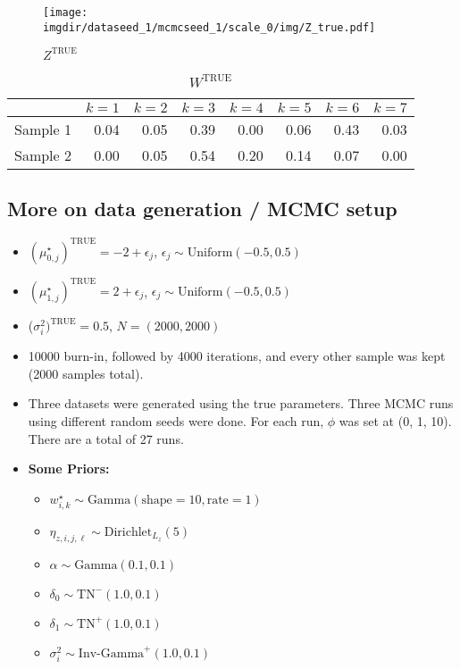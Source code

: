 \documentclass[10pt]{article} %
\newcommand{\Gam}{ \text{Gamma} }
\newcommand{\InvGamma}{ \text{Inv-Gamma} }
\newcommand{\Uniform}{ \text{Uniform} }
\def\Dir{\text{Dirichlet}}
\def\TN{\text{TN}}
\def\true{\text{TRUE}}
\def\imgdir{../../results/test-sim-6-6-1}
\begin{document}
\begin{figure}[H]
  \begin{center}  %
    \texttt{[image: \\imgdir/dataseed\_1/mcmcseed\_1/scale\_0/img/Z\_true.pdf]}
  \end{center}
  \caption{$Z^\true$}
  \label{fig:Z-true}
\end{figure}

\begin{table}[ht]
  \centering
  \begin{tabular}{rrrrrrrr}
    \hline
    & $k=1$ & $k=2$ & $k=3$ & $k=4$ & $k=5$ & $k=6$ & $k=7$ \\
    \hline
    Sample 1 & 0.04 & 0.05 & 0.39 & 0.00 & 0.06 & 0.43 & 0.03 \\
    Sample 2 & 0.00 & 0.05 & 0.54 & 0.20 & 0.14 & 0.07 & 0.00 \\
    \hline
  \end{tabular}
  \caption{$W^\true$}
  \label{tab:W-true}
\end{table}

\subsection{More on data generation / MCMC setup}
\begin{itemize}
  \item $(\mu_{0,j}^\star)^\true=-2 + \epsilon_j$, $\epsilon_j \sim \Uniform(-0.5, 0.5)$
  \item $(\mu_{1,j}^\star)^\true=2 + \epsilon_j$, $\epsilon_j \sim \Uniform(-0.5, 0.5)$
  \item ($\sigma^2_i)^\true=0.5$, $N=(2000, 2000)$
  \item 10000 burn-in, followed by 4000 iterations, and every other sample was
    kept (2000 samples total).
  \item Three datasets were generated using the true parameters. Three MCMC runs using 
    different random seeds were done. For each run, $\phi$ was set at (0, 1, 10). There
    are a total of 27 runs.
  \item \textbf{Some Priors:}
  \begin{itemize}
    \item $w^\star_{i,k} \sim \Gam(\text{shape}=10, \text{rate}=1)$
    \item $\eta_{z, i,j,\ell} \sim \Dir_{L_z}(5)$
    \item $\alpha \sim \Gam(0.1, 0.1)$
    \item $\delta_0 \sim \TN^-(1.0, 0.1)$
    \item $\delta_1 \sim \TN^+(1.0, 0.1)$
    \item $\sigma^2_i \sim \InvGamma^+(1.0, 0.1)$
  \end{itemize}
\end{itemize}
\end{document}
